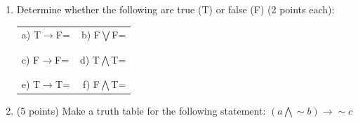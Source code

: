 \documentclass[12pt]{article}
\newcommand{\tab}{\hspace*{2em}}
\begin{document}
\begin{enumerate}
\tab c) I take Calculus if I do not take Finite Mathematics.

\tab d) If I don't take Calculus, then I take Finite Mathematics.

Converse: \underline{\hspace{1.0 in}}

Inverse: \underline{\hspace{1.0 in}}

Contrapositive: \underline{\hspace{1.0 in}}

\newpage

\item Determine whether the following are true (T) or false (F) (2 points each):

\begin{tabular}{l r}

a) T$\rightarrow$F=\underline{\hspace{.5 in}} &\quad\quad\quad\quad\quad\quad\quad\quad
\quad\quad\quad b) F$\bigvee$F=\underline{\hspace{.5 in}}\\
 &\\
 &\\
c) F$\rightarrow$F=\underline{\hspace{.5 in}} &d) T$\bigwedge$T=\underline{\hspace{.5 in}} \\
 &\\
 &\\
e) T$\rightarrow$T=\underline{\hspace{.5 in}} &  f) F$\bigwedge$T=\underline{\hspace{.5 in}}
\end{tabular}


\item (5 points) Make a truth table for the following statement: $(a\bigwedge \sim b)\rightarrow\sim c$
\begin{center}
\begin{tabular}{|c|c|c|c|c|c|c|c|}


\end{tabular}
\end{center}
\end{enumerate}
\end{document}
